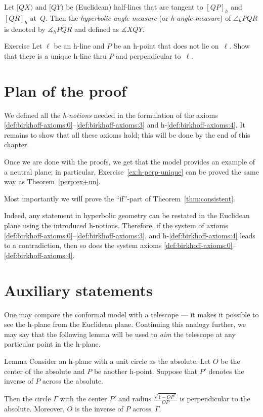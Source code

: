 Let $[QX)$ and $[QY)$ be (Euclidean) half-lines 
that are tangent to $[QP]_h$ and $[QR]_h$ 
at~$Q$.
Then the \emph{hyperbolic angle measure} (or \emph{h-angle measure}) of $\angle_h PQR$ is denoted by
$\measuredangle_h PQR$ and defined as
$\measuredangle XQY$.

\begin{thm}{Exercise}\label{ex:h-perp-unique}
Let $\ell$ be an h-line and $P$ be an h-point that does not lie on~$\ell$.
Show that there is a unique h-line thru $P$ and perpendicular to~$\ell$.
\end{thm}

\section{Plan of the proof}

We defined all the {}\emph{h-notions} needed in the formulation of the axioms \ref{def:birkhoff-axioms:0}--\ref{def:birkhoff-axioms:3} and h-\ref{def:birkhoff-axioms:4}.
It remains to show that all these axioms hold; 
this will be done by the end of this chapter.

Once we are done with the proofs, 
we get that the model provides an example of a neutral plane; 
in particular, Exercise~\ref{ex:h-perp-unique} can be proved the same way as Theorem~\ref{perp:ex+un}.

Most importantly we will prove the ``if''-part of Theorem~\ref{thm:consistent}.

Indeed, any statement in hyperbolic geometry can be restated in the Euclidean plane using the introduced h-notions.
Therefore, if the system of axioms \ref{def:birkhoff-axioms:0}--\ref{def:birkhoff-axioms:3}, and h-\ref{def:birkhoff-axioms:4} leads to a contradiction, then so does the system axioms \ref{def:birkhoff-axioms:0}--\ref{def:birkhoff-axioms:4}.

\section{Auxiliary statements}

One may compare the conformal model with a telescope --- it makes it possible to see the h-plane from the Euclidean plane.
Continuing this analogy further, we may say that the following lemma will be used to \textit{aim} the telescope at any particular point in the h-plane.

\begin{thm}{Lemma}\label{lem:P-->O} 
Consider an h-plane with a unit circle as the absolute.
Let $O$ be the center of the absolute and $P$ be another h-point.
Suppose that $P'$ denotes the inverse of $P$ across the absolute.

Then the circle $\Gamma$ with the center $P'$ and radius 
$\tfrac{\sqrt{1-OP^2}}{OP}$
is perpendicular to the absolute.
Moreover, $O$ is the inverse of $P$ across~$\Gamma$. 
\end{thm}

